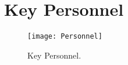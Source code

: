 \section{Key Personnel}
\begin{figure}
    \centering
    \texttt{[image: Personnel]}
    \caption{Key Personnel.}
\end{figure}